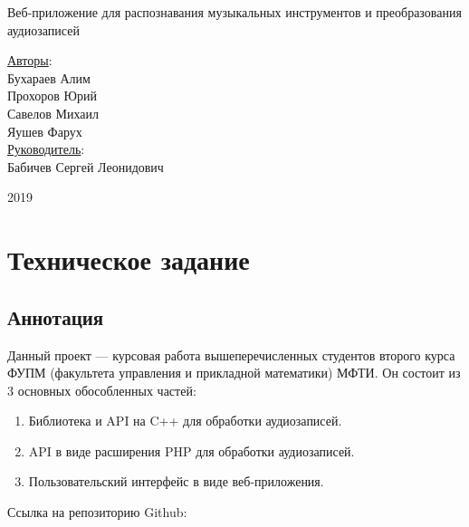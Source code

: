 \documentclass[14pt,a4paper]{article}
\begin{document}
\text{}
\vskip 8cm
\begin{center}
\begin{minipage}{0.8\textwidth}
\begin{center}
\Huge Веб-приложение для распознавания музыкальных инструментов и преобразования аудиозаписей
\end{center}
\end{minipage}
\end{center}

\vskip 5.5cm

\begin{flushright}
\Large \underline{Авторы}: \\
Бухараев Алим \\
Прохоров Юрий \\
Савелов Михаил \\
Яушев Фарух \\
\bigskip
\Large \underline{Руководитель}: \\
Бабичев Сергей Леонидович
\end{flushright}

\vskip 2.6cm

\begin{center}
2019
\end{center}

\newpage

\renewcommand\contentsname{\huge Содержание}
\setcounter{tocdepth}{2}
\Large \tableofcontents
\normalsize

\newpage 

\section[Техническое задание]{\huge Техническое задание}

\subsection{Аннотация}

Данный проект --- курсовая работа вышеперечисленных студентов второго курса ФУПМ (факультета управления и прикладной математики) МФТИ. Он состоит из 3 основных обособленных частей:
\begin{enumerate}
\item Библиотека и API на C++ для обработки аудиозаписей.
\item API в виде расширения PHP для обработки аудиозаписей.
\item Пользовательский интерфейс в виде веб-приложения.
\end{enumerate}
Ссылка на репозиторию Github:\\\\
\\
\end{document}

